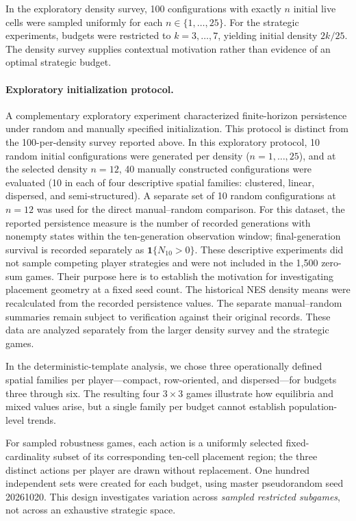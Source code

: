 \documentclass[games,article,submit,moreauthors]{Definitions/mdpi}
\begin{document}
In the exploratory density survey, 100 configurations with exactly $n$ initial live cells were sampled uniformly for each $n\in\{1,\ldots,25\}$. For the strategic experiments, budgets were restricted to $k=3,\ldots,7$, yielding initial density $2k/25$. The density survey supplies contextual motivation rather than evidence of an optimal strategic budget.

\paragraph{Exploratory initialization protocol.}
A complementary exploratory experiment characterized finite-horizon persistence under random and manually specified initialization. This protocol is distinct from the 100-per-density survey reported above. In this exploratory protocol, 10 random initial configurations were generated per density ($n=1,\ldots,25$), and at the selected density $n=12$, 40 manually constructed configurations were evaluated (10 in each of four descriptive spatial families: clustered, linear, dispersed, and semi-structured). A separate set of 10 random configurations at $n=12$ was used for the direct manual--random comparison. For this dataset, the reported persistence measure is the number of recorded generations with nonempty states within the ten-generation observation window; final-generation survival is recorded separately as $\mathbf{1}\{N_{10}>0\}$. These descriptive experiments did not sample competing player strategies and were not included in the 1,500 zero-sum games. Their purpose here is to establish the motivation for investigating placement geometry at a fixed seed count. The historical NES density means were recalculated from the recorded persistence values. The separate manual--random summaries remain subject to verification against their original records. These data are analyzed separately from the larger density survey and the strategic games.


In the deterministic-template analysis, we chose three operationally defined spatial families per player---compact, row-oriented, and dispersed---for budgets three through six. The resulting four $3\times3$ games illustrate how equilibria and mixed values arise, but a single family per budget cannot establish population-level trends.

For sampled robustness games, each action is a uniformly selected fixed-cardinality subset of its corresponding ten-cell placement region; the three distinct actions per player are drawn without replacement. One hundred independent sets were created for each budget, using master pseudorandom seed 20261020. This design investigates variation across \emph{sampled restricted subgames}, not across an exhaustive strategic space.
\end{document}
